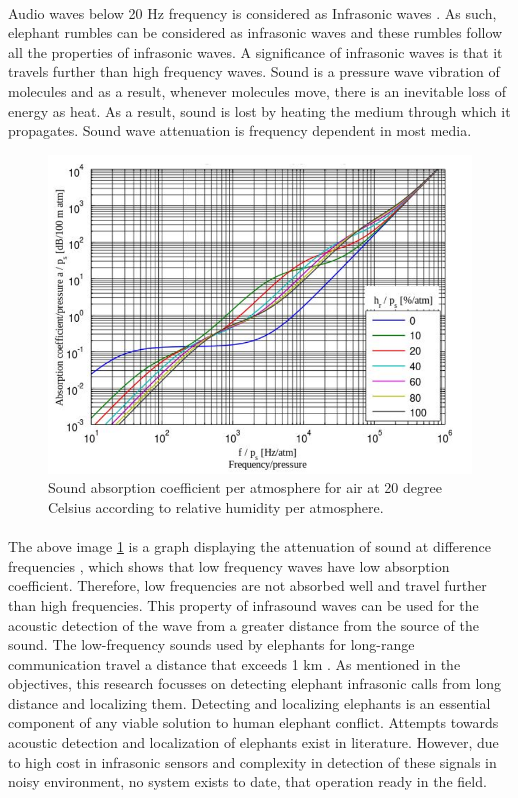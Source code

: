 \documentclass[12pt]{article}
\numberwithin{figure}{section}
\numberwithin{table}{section}
\begin{document}
\paragraph{}
Audio waves below 20 Hz frequency is considered as Infrasonic waves \cite {4}. As such, elephant rumbles can be considered as infrasonic waves and these rumbles follow all the properties of infrasonic waves. A significance of infrasonic waves is that it travels further than high frequency waves. Sound is a pressure wave vibration of molecules and as a result, whenever molecules move, there is an inevitable loss of energy as heat. As a result, sound is lost by heating the medium through which it propagates. Sound wave attenuation is frequency dependent in most media.

\begin{figure}[H]
\centering
\includegraphics[width= 15cm]{a.png}
\caption{Sound absorption coefficient per atmosphere for air at 20 degree Celsius according to relative humidity per atmosphere.\cite{14}}
\label{fig:logo}
\end{figure}


\paragraph{}
The above image \ref{fig:logo} is a graph displaying the attenuation of sound at difference frequencies \cite {5}, which shows that low frequency waves have low absorption coefficient. Therefore, low frequencies are not absorbed well and travel further than high frequencies. This property of infrasound waves can be used  for the acoustic detection of the wave from a greater distance from the source of the sound. The low-frequency sounds used by elephants for long-range communication travel a distance that exceeds 1 km \cite {3}. As mentioned in the objectives, this research focusses on detecting elephant infrasonic calls from long distance and localizing them. Detecting and localizing elephants is an essential component of any viable solution to human elephant conflict. Attempts towards acoustic detection and localization of elephants exist in literature. However, due to high cost in infrasonic sensors and complexity in detection of these signals  in noisy environment, no system exists to date, that operation ready in the field.
\end{document}
